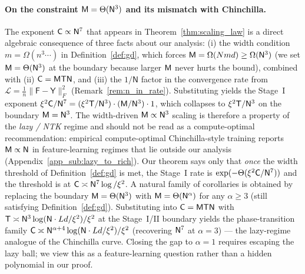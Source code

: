 \documentclass[11pt]{article}
\theoremstyle{plain}
\begin{document}
\paragraph{On the constraint ${\sf M}=\Theta({\sf N}^3)$ and its mismatch with Chinchilla.} The exponent ${\sf C}\propto {\sf N}^7$ that appears in Theorem~\ref{thm:scaling_law} is a direct algebraic consequence of three facts about our analysis: (i) the width condition $m=\Omega(n^3 \cdots)$ in Definition~\ref{def:gd}, which forces ${\sf M}=\Omega(Nmd)\ge \Omega({\sf N}^3)$ (we set ${\sf M}=\Theta({\sf N}^3)$ at the boundary because larger ${\sf M}$ never hurts the bound), combined with (ii) ${\sf C}={\sf MTN}$, and (iii) the $1/\mathsf{N}$ factor in the convergence rate from $\mathcal{L}=\frac{1}{n}\|\mathsf{F}-\mathsf{Y}\|_F^2$ (Remark~\ref{rem:n_in_rate}). Substituting yields the Stage~I exponent $\xi^2{\sf C}/{\sf N}^7 = (\xi^2{\sf T}/{\sf N}^3) \cdot ({\sf M}/{\sf N}^3) \cdot 1$, which collapses to $\xi^2 {\sf T}/{\sf N}^3$ on the boundary ${\sf M}={\sf N}^3$. The width-driven ${\sf M}\propto {\sf N}^3$ scaling is therefore a property of the {\it lazy / NTK} regime and should not be read as a compute-optimal recommendation: empirical compute-optimal Chinchilla-style training \citep{hbm+22, mas+23} reports ${\sf M}\propto {\sf N}$ in feature-learning regimes that lie outside our analysis (Appendix~\ref{app_sub:lazy_to_rich}). Our theorem says only that {\it once} the width threshold of Definition~\ref{def:gd} is met, the Stage~I rate is $\exp(-\Theta(\xi^2 {\sf C}/{\sf N}^7))$ and the threshold is at ${\sf C}\asymp{\sf N}^7\log/\xi^2$. A natural family of corollaries is obtained by replacing the boundary ${\sf M}=\Theta({\sf N}^3)$ with ${\sf M}=\Theta({\sf N}^\alpha)$ for any $\alpha\ge 3$ (still satisfying Definition~\ref{def:gd}). Substituting into ${\sf C}={\sf MTN}$ with ${\sf T}\asymp {\sf N}^3\log({\sf N}\cdot Ld/\xi^2)/\xi^2$ at the Stage~I/II boundary yields the phase-transition family ${\sf C}\asymp {\sf N}^{\alpha+4}\log({\sf N}\cdot Ld/\xi^2)/\xi^2$ (recovering ${\sf N}^7$ at $\alpha=3$) — the lazy-regime analogue of the Chinchilla curve. Closing the gap to $\alpha=1$ requires escaping the lazy ball; we view this as a feature-learning question rather than a hidden polynomial in our proof.
\end{document}
